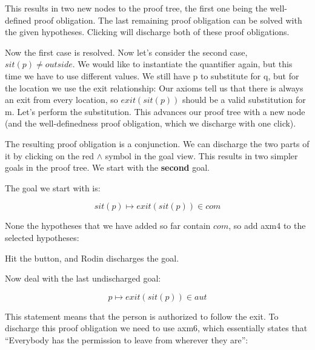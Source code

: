 This results in two new nodes to the proof tree, the first one being the well-defined proof obligation.  The last remaining proof obligation can be solved with the given hypotheses.  Clicking  will discharge both of these proof obligations.

Now the first case is resolved.  Now let's consider the second case, $sit(p) \neq outside$.  We would like to instantiate the quantifier again, but this time we have to use different values.  We still have p to substitute for q, but for the location we use the exit relationship: Our axioms tell us that there is always an exit from every location, so $exit(sit(p))$ should be a valid substitution for m. Let's perform the substitution.  This advances our proof tree with a new node (and the well-definedness proof obligation, which we discharge with one click).

The resulting proof obligation is a conjunction.  We can discharge the two parts of it by clicking on the red $\land$ symbol in the goal view. This results in two simpler goals in the proof tree.  We start with the \textbf{second} goal.


The goal we start with is:

$$ sit(p) \mapsto exit(sit(p)) \in com $$

None the hypotheses that we have added so far contain $com$, so add \textsf{axm4} to the selected hypotheses:


Hit the  button, and Rodin discharges the goal.

Now deal with the last undischarged goal:

$$ p \mapsto exit(sit(p)) \in aut $$

This statement means that the person is authorized to follow the exit. To discharge this proof obligation we need to use \textsf{axm6}, which essentially states that ``Everybody has the permission to leave from wherever they are'':

